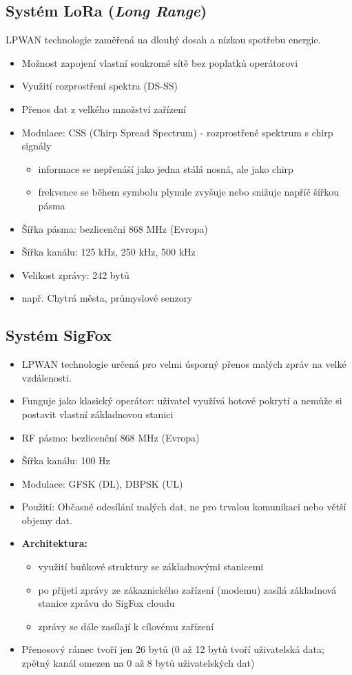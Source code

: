 \subsection{Systém LoRa (\textit{Long Range})}
LPWAN technologie zaměřená na dlouhý dosah a nízkou spotřebu energie.\\
\begin{itemize}
	\item Možnost zapojení vlastní soukromé sítě bez poplatků operátorovi
	\item Využití rozprostření spektra (DS-SS)
	\item Přenos dat z velkého množství zařízení
	\item Modulace: CSS (Chirp Spread Spectrum) - rozprostřené spektrum s chirp signály
	\begin{itemize}	
		\item informace se nepřenáší jako jedna stálá nosná, ale jako chirp
		\item frekvence se během symbolu plynule zvyšuje nebo snižuje napříč šířkou pásma
	\end{itemize}
	\item Šířka pásma: bezlicenční 868 MHz (Evropa)
	\item Šířka kanálu: 125 kHz, 250 kHz, 500 kHz
	\item Velikost zprávy: 242 bytů
	\item např. Chytrá města, průmyslové senzory
\end{itemize}

\subsection{Systém SigFox}
\begin{itemize}
	\item LPWAN technologie určená pro velmi úsporný přenos malých zpráv na velké vzdálenosti.
	\item Funguje jako klasický operátor: uživatel využívá hotové pokrytí a nemůže si postavit vlastní základnovou stanici
	\item RF pásmo: bezlicenční 868 MHz (Evropa)
	\item Šířka kanálu: 100 Hz
	\item Modulace: GFSK (DL), DBPSK (UL)
	\item Použití: Občasné odesílání malých dat, ne pro trvalou komunikaci nebo větší objemy dat.
	\item \textbf{Architektura:}
	\begin{itemize}	
		\item využití buňkové struktury se základnovými stanicemi
		\item po přijetí zprávy ze zákaznického zařízení (modemu) zasílá základnová stanice zprávu do SigFox cloudu
		\item zprávy se dále zasílají k cílovému zařízení
	\end{itemize}
	\item Přenosový rámec tvoří jen 26 bytů (0 až 12 bytů tvoří uživatelská data; zpětný kanál omezen na 0 až 8 bytů uživatelských dat)
\end{itemize}

